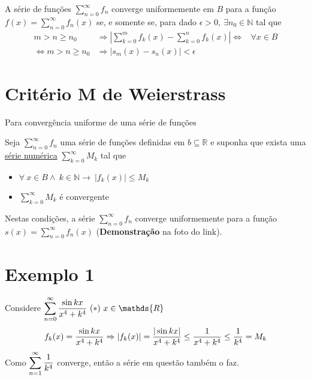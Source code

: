 \documentclass[12pt,openany, letterpaper]{book}
\newcommand{\soma}[2][n]{\sum_{{#1} = #2}^\infty}
\begin{document}
\hspace{5mm} A série de funções $\displaystyle{\soma{0} f_n}$ converge uniformemente em $B$ para a função $\displaystyle{f(x) = \soma{0} f_n(x)}$ se, e somente se, para dado $\epsilon > 0, \ \exists n_0 \in \mathds{N}$ tal que \begin{align*}
m>n \geq n_0 \ &\Rightarrow \left| \sum_{k=0}^m f_k (x) - \sum_{k=0}^n f_k (x)\right|  \Longleftrightarrow & \forall x \in B \\
\Longleftrightarrow m > n \geq n_0 &\Rightarrow |s_m(x) - s_n(x)| < \epsilon
\end{align*}

\section{Critério M de Weierstrass} {Para convergência uniforme de uma série de funções}

Seja $\displaystyle{\soma{0} f_n}$ uma série de funções definidas em $b \subseteq \mathds{R}$ e suponha que exista uma \underline{série numérica} $\displaystyle{\soma[k]{0} M_k}$ tal que \begin{itemize}
\item $\forall \ x \in B \land \ k \in \mathds{N} \rightarrow \ |f_k(x)| \leq M_k$
\item $\displaystyle{\soma[k]{0} M_k}$ é convergente
\end{itemize}

Nestas condições, a série $\displaystyle{\soma{0} f_n}$ converge uniformemente para a função $\displaystyle{s(x) = \soma{0} f_n(x)}$ (\textbf{Demonstração} na foto do link).

\section*{Exemplo 1} {Considere $\displaystyle{\soma{0} {\sin kx \over x^4 + k^4} \ (*) \ x \in \mathds{R}}$}
$$f_k(x) = {\sin kx \over x^4 + k^4} \Rightarrow |f_k(x)| = {|\sin kx| \over x^4 + k^4} \leq {1 \over x^4 + k^4} \leq {1 \over k^4} = M_k$$ Como $\displaystyle{\soma{1} {1 \over k^4}}$ converge, então a série em questão também o faz.
\end{document}
